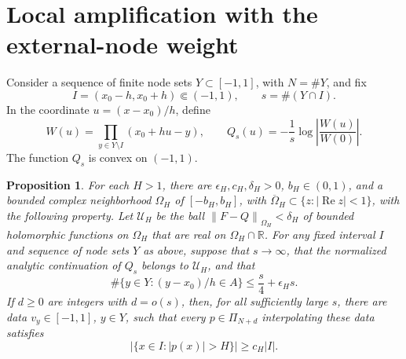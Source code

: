 \documentclass[11pt]{article}
\newtheorem{proposition}[theorem]{Proposition}
\theoremstyle{definition}
\numberwithin{equation}{section}
\newcommand{\R}{\mathbb R}
\newcommand{\norm}[1]{\left\lVert #1\right\rVert}
\begin{document}
\section{Local amplification with the external-node weight}
\label{sec:weighted}

Consider a sequence of finite node sets \(Y\subset[-1,1]\),
with \(N=\#Y\), and fix
\[
 I=(x_0-h,x_0+h)\Subset(-1,1),
 \qquad s=\#(Y\cap I).
\]
In the coordinate \(u=(x-x_0)/h\), define
\begin{equation}\label{eq:actual-field}
 W(u)=\prod_{y\in Y\setminus I}(x_0+hu-y),
 \qquad
 Q_s(u)=-\frac1s\log\left|\frac{W(u)}{W(0)}\right|.
\end{equation}
The function \(Q_s\) is convex on \((-1,1)\).

\begin{proposition}\label{prop:weighted}
For each \(H>1\), there are \(\epsilon_H,c_H,\delta_H>0\),
\(b_H\in(0,1)\), and a bounded complex neighborhood \(\Omega_H\)
of \([-b_H,b_H]\), with
\(\overline\Omega_H\subset\{z:|\operatorname{Re}z|<1\}\),
with the following property. Let \(\mathcal U_H\) be the ball
\(\norm{F-Q}_{\Omega_H}<\delta_H\) of bounded holomorphic
functions on \(\Omega_H\) that are real on \(\Omega_H\cap\R\).
For any fixed interval \(I\) and sequence of node sets \(Y\) as
above, suppose that \(s\to\infty\), that the normalized analytic
continuation of \(Q_s\) belongs to \(\mathcal U_H\), and that
\begin{equation}\label{eq:central-count}
 \#\{y\in Y:(y-x_0)/h\in A\}
 \le \frac{s}{4}+\epsilon_H s.
\end{equation}
If \(d\ge0\) are integers with \(d=o(s)\), then, for all sufficiently
large \(s\), there are
data \(v_y\in[-1,1]\), \(y\in Y\), such that every
\(p\in\Pi_{N+d}\) interpolating these data satisfies
\begin{equation}\label{eq:local-amplification}
 |\{x\in I:|p(x)|>H\}|\ge c_H|I|.
\end{equation}
\end{proposition}
\end{document}
